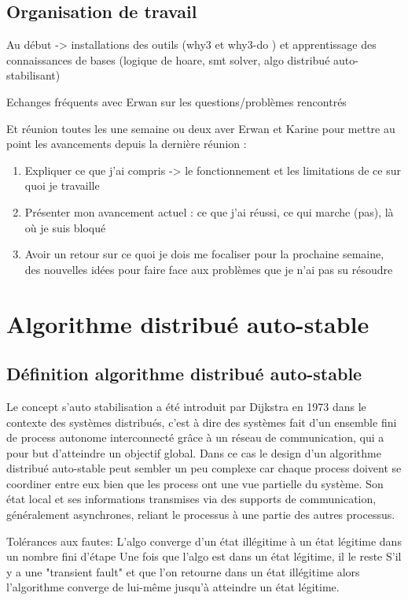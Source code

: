 \documentclass[11pt]{article}
\begin{document}
\subsection{Organisation de travail}
\label{sec:org507ffd4}

Au début -> installations des outils (why3 et why3-do ) et apprentissage des connaissances de bases (logique de hoare, smt solver, algo distribué auto-stabilisant)

Echanges fréquents avec Erwan sur les questions/problèmes rencontrés

Et réunion toutes les une semaine ou deux aver Erwan et Karine pour mettre au point les avancements depuis la dernière réunion : 
\begin{enumerate}
\item Expliquer ce que j'ai compris -> le fonctionnement et les limitations de ce sur quoi je travaille
\item Présenter mon avancement actuel : ce que j'ai réussi, ce qui marche (pas), là où je suis bloqué
\item Avoir un retour sur ce quoi je dois me focaliser pour la prochaine semaine, des nouvelles idées pour faire face aux problèmes que je n'ai pas su résoudre
\end{enumerate}

\section{Algorithme distribué auto-stable}
\label{sec:org99d2ae0}


\subsection{Définition algorithme distribué auto-stable}
\label{sec:org3c4bbdd}


Le concept s'auto stabilisation a été introduit par Dijkstra en 1973 dans le contexte des systèmes distribués, 
c'est à dire des systèmes fait d'un ensemble fini de process autonome interconnecté grâce à un réseau de 
communication, qui a pour but d'atteindre un objectif global. Dans ce cas le design d'un algorithme
distribué auto-stable peut sembler un peu complexe car chaque process doivent se coordiner entre eux 
bien que les process ont une vue partielle du système. Son état local et ses informations transmises 
via des supports de communication, généralement asynchrones, reliant le processus à une partie des autres processus.


 Tolérances aux fautes: 
L'algo converge d'un état illégitime à un état légitime dans un nombre fini d'étape
 Une fois que l'algo est dans un état légitime, il le reste
S'il y a une "transient fault" et que l'on retourne dans un état illégitime alors l'algorithme converge de lui-même 
jusqu'à atteindre un état légitime.
\end{document}
